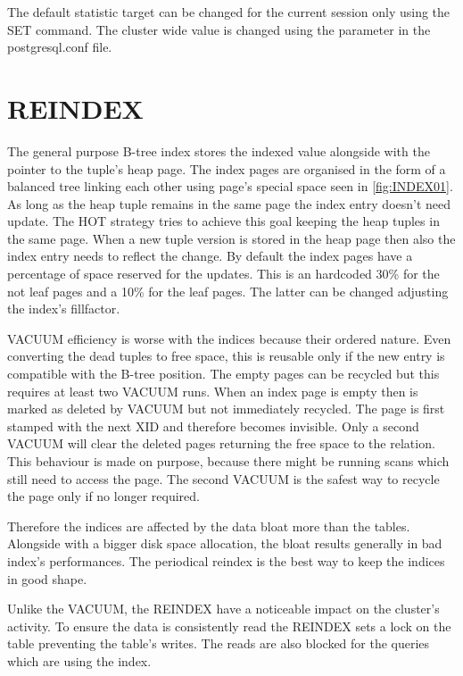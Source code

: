 The default statistic target can be changed for the current session only using the SET command. The cluster 
wide value is changed using the parameter in the postgresql.conf file.

\section{REINDEX}\label{sec:REINDEX}
The general purpose B-tree index stores the indexed value alongside with the pointer to the 
tuple's heap page. The index pages are organised in the form of a balanced tree linking each other 
using page's special space seen in \ref{fig:INDEX01}. As long as the heap tuple remains in the same page
the index entry doesn't need update. The HOT strategy tries to achieve this goal keeping 
the heap tuples in the same page. When a new tuple version is stored in the heap page then also the index 
entry needs to reflect the change. By default the index pages have a percentage of space reserved for 
the updates. This is an hardcoded 30\% for the not leaf pages and a 10\% for the leaf 
pages. The latter can be changed adjusting the index's fillfactor.\newline

VACUUM efficiency is worse with the indices because their ordered nature. Even converting the dead 
tuples to free space, this is reusable only if the new entry is compatible with the B-tree position. 
The empty pages can be recycled but this requires at least two VACUUM runs. When an index page is empty 
then is marked as deleted by VACUUM but not immediately recycled. The page is first stamped with the next 
XID and therefore becomes invisible. Only a second VACUUM will clear the deleted pages returning the 
free space to the relation. This behaviour is made on purpose, because there might be running 
scans which still need to access the page. The second VACUUM is the safest way to recycle the page only 
if no longer required.\newline

Therefore the indices are affected by the data bloat more than the tables. Alongside with a bigger disk 
space allocation, the bloat results generally in bad index's performances. The periodical reindex 
is the best way to keep the indices in good shape.\newline

Unlike the VACUUM, the REINDEX have a noticeable impact on the cluster's activity. To ensure the data is 
consistently read the REINDEX sets a lock on the table preventing the table's writes. The reads are also 
blocked for the queries which are using the index.\newline

